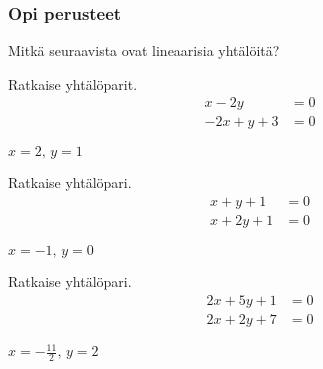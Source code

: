 \begin{tehtavasivu}

\subsubsection*{Opi perusteet}

\begin{tehtava}
  Mitkä seuraavista ovat lineaarisia yhtälöitä?
  \begin{alakohdat}
  \end{alakohdat}
  \begin{vastaus}
    \begin{alakohdat}
    \end{alakohdat}
  \end{vastaus}
\end{tehtava}

\begin{tehtava}
    Ratkaise yhtälöparit.
    \begin{align*}
        x-2y &= 0 \\
        -2x+y+3 &=0
    \end{align*}
    \begin{vastaus}
        $x = 2, \, y = 1$
    \end{vastaus}
\end{tehtava}

\begin{tehtava}
    Ratkaise yhtälöpari.
    \begin{align*}
        x+y+1 &= 0 \\
        x+2y+1 &=0
    \end{align*}
    \begin{vastaus}
        $x = -1, \, y = 0$
    \end{vastaus}
\end{tehtava}

\begin{tehtava}
    Ratkaise yhtälöpari.
    \begin{align*}
        2x+5y+1 &= 0 \\
        2x+2y+7 &=0
    \end{align*}
    \begin{vastaus}
        $x = -\frac{11}{2}, \, y = 2$
    \end{vastaus}
\end{tehtava}


\end{tehtavasivu}
